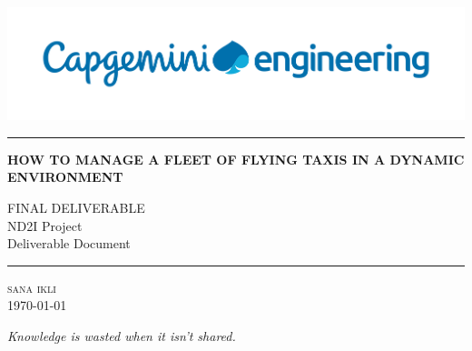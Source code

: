 \begin{titlepage}
	\begin{center}
		\vspace*{1cm}
		
		\includegraphics[width=.95\textwidth]{images/cap-logo}
		
		
		\vspace*{3.4cm}
        \begin{center}
		\rule{12cm}{1.4pt}
		\end{center}
		
		\textbf{\MakeUppercase{How to manage a fleet of flying taxis in a dynamic environment}}
		
		\vspace{0.3cm}
		\textsc{FINAL DELIVERABLE}\\
		
		\vspace{0.6cm}
		ND2I Project\\
		Deliverable Document
		\begin{center}
			\rule{8cm}{1.2pt}
		\end{center}


		\vspace{1cm}

		{\large\textsc{sana ikli}}\\
		\today
		
		\vspace{4cm}
		\hfill\og\textit{Knowledge is wasted when it isn't shared.}\fg
		
	\end{center}
	\end{titlepage}	
